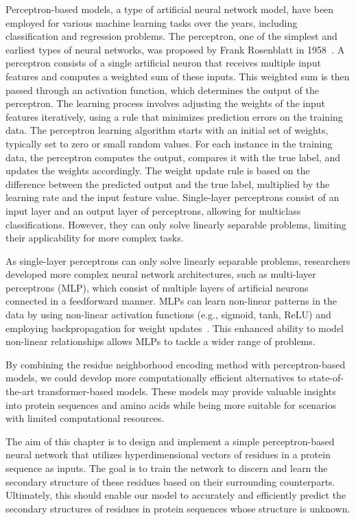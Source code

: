 Perceptron-based models, a type of artificial neural network model, have been employed for various machine learning tasks over the years, including classification and regression problems. The perceptron, one of the simplest and earliest types of neural networks, was proposed by Frank Rosenblatt in 1958~\cite{perceptron}. A perceptron consists of a single artificial neuron that receives multiple input features and computes a weighted sum of these inputs. This weighted sum is then passed through an activation function, which determines the output of the perceptron. The learning process involves adjusting the weights of the input features iteratively, using a rule that minimizes prediction errors on the training data. The perceptron learning algorithm starts with an initial set of weights, typically set to zero or small random values. For each instance in the training data, the perceptron computes the output, compares it with the true label, and updates the weights accordingly. The weight update rule is based on the difference between the predicted output and the true label, multiplied by the learning rate and the input feature value. Single-layer perceptrons consist of an input layer and an output layer of perceptrons, allowing for multiclass classifications. However, they can only solve linearly separable problems, limiting their applicability for more complex tasks.

As single-layer perceptrons can only solve linearly separable problems, researchers developed more complex neural network architectures, such as multi-layer perceptrons (MLP), which consist of multiple layers of artificial neurons connected in a feedforward manner. MLPs can learn non-linear patterns in the data by using non-linear activation functions (e.g., sigmoid, tanh, ReLU) and employing backpropagation for weight updates~\cite{mlp}. This enhanced ability to model non-linear relationships allows MLPs to tackle a wider range of problems.

By combining the residue neighborhood encoding method with perceptron-based models, we could develop more computationally efficient alternatives to state-of-the-art transformer-based models. These models may provide valuable insights into protein sequences and amino acids while being more suitable for scenarios with limited computational resources. 

The aim of this chapter is to design and implement a simple perceptron-based neural network that utilizes hyperdimensional vectors of residues in a protein sequence as inputs. The goal is to train the network to discern and learn the secondary structure of these residues based on their surrounding counterparts. Ultimately, this should enable our model to accurately and efficiently predict the secondary structures of residues in protein sequences whose structure is unknown.

